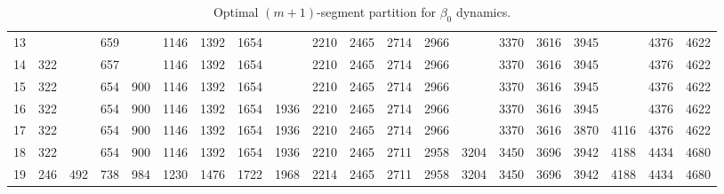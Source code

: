 \begin{landscape}
\begin{table}
\begin{tabular}{|c|ccccccccccccccccccc|}
                13 &      &     & 659 &     & 1146 & 1392 & 1654 &      & 2210 & 2465 & 2714 & 2966 &      & 3370 & 3616 & 3945 &      & 4376 & 4622 \\
                14 &  322 &     & 657 &     & 1146 & 1392 & 1654 &      & 2210 & 2465 & 2714 & 2966 &      & 3370 & 3616 & 3945 &      & 4376 & 4622 \\
                15 &  322 &     & 654 & 900 & 1146 & 1392 & 1654 &      & 2210 & 2465 & 2714 & 2966 &      & 3370 & 3616 & 3945 &      & 4376 & 4622 \\
                16 &  322 &     & 654 & 900 & 1146 & 1392 & 1654 & 1936 & 2210 & 2465 & 2714 & 2966 &      & 3370 & 3616 & 3945 &      & 4376 & 4622 \\
                17 &  322 &     & 654 & 900 & 1146 & 1392 & 1654 & 1936 & 2210 & 2465 & 2714 & 2966 &      & 3370 & 3616 & 3870 & 4116 & 4376 & 4622 \\
                18 &  322 &     & 654 & 900 & 1146 & 1392 & 1654 & 1936 & 2210 & 2465 & 2711 & 2958 & 3204 & 3450 & 3696 & 3942 & 4188 & 4434 & 4680 \\
                19 &  246 & 492 & 738 & 984 & 1230 & 1476 & 1722 & 1968 & 2214 & 2465 & 2711 & 2958 & 3204 & 3450 & 3696 & 3942 & 4188 & 4434 & 4680 \\
                \hline
            \end{tabular}
            \caption{Optimal $(m+1)$-segment partition for $\beta_0$ dynamics.}
            \label{tab:optimal_partition_beta0}
        \end{table}


\end{landscape}

